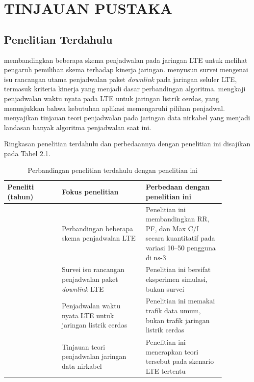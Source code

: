\chapter{TINJAUAN PUSTAKA}

\section{Penelitian Terdahulu}
\textcite{alqahtani2013} membandingkan beberapa skema penjadwalan pada jaringan LTE untuk melihat pengaruh pemilihan skema terhadap kinerja jaringan. \textcite{capozzi2013} menyusun survei mengenai isu rancangan utama penjadwalan paket \textit{downlink} pada jaringan seluler LTE, termasuk kriteria kinerja yang menjadi dasar perbandingan algoritma. \textcite{xu2012} mengkaji penjadwalan waktu nyata pada LTE untuk jaringan listrik cerdas, yang menunjukkan bahwa kebutuhan aplikasi memengaruhi pilihan penjadwal. \textcite{andrews2007} menyajikan tinjauan teori penjadwalan pada jaringan data nirkabel yang menjadi landasan banyak algoritma penjadwalan saat ini.

\needspace{9cm}
Ringkasan penelitian terdahulu dan perbedaannya dengan penelitian ini disajikan pada Tabel 2.1.

\begin{singlespace}
\begin{longtable}{|p{0.22\linewidth}|p{0.34\linewidth}|p{0.32\linewidth}|}
\caption{Perbandingan penelitian terdahulu dengan penelitian ini}\\
\hline
\textbf{Peneliti (tahun)} & \textbf{Fokus penelitian} & \textbf{Perbedaan dengan penelitian ini} \\
\hline
\textcite{alqahtani2013} & Perbandingan beberapa skema penjadwalan LTE & Penelitian ini membandingkan RR, PF, dan Max C/I secara kuantitatif pada variasi 10--50 pengguna di ns-3 \\
\hline
\textcite{capozzi2013} & Survei isu rancangan penjadwalan paket \textit{downlink} LTE & Penelitian ini bersifat eksperimen simulasi, bukan survei \\
\hline
\textcite{xu2012} & Penjadwalan waktu nyata LTE untuk jaringan listrik cerdas & Penelitian ini memakai trafik data umum, bukan trafik jaringan listrik cerdas \\
\hline
\textcite{andrews2007} & Tinjauan teori penjadwalan jaringan data nirkabel & Penelitian ini menerapkan teori tersebut pada skenario LTE tertentu \\
\hline
\end{longtable}
\end{singlespace}

